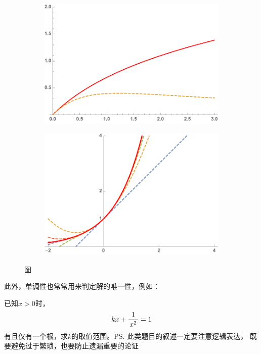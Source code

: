 \begin{figure}[h]
	\centering
	\begin{subfigure}[t]{0.4\textwidth}
		\centering
		\includegraphics[width=\textwidth]
		{./Images/Ch03/lnxArctanx.pdf}
	\end{subfigure}\quad
	\begin{subfigure}[t]{0.4\textwidth}
		\centering
		\includegraphics[width=\textwidth]
		{./Images/Ch03/exTaylor.pdf}
	\end{subfigure}
	\caption{\exNo 图}
\end{figure}

此外，单调性也常常用来判定解的唯一性，例如：

\egz 已知$x>0$时，
$$kx+\displaystyle\frac{\,{1}\,}{\,{x^2}\,}=1$$
有且仅有一个根，求$k$的取值范围。\ps{此类题目的叙述一定要注意逻辑表达，
既要避免过于繁琐，也要防止遗漏重要的论证}


